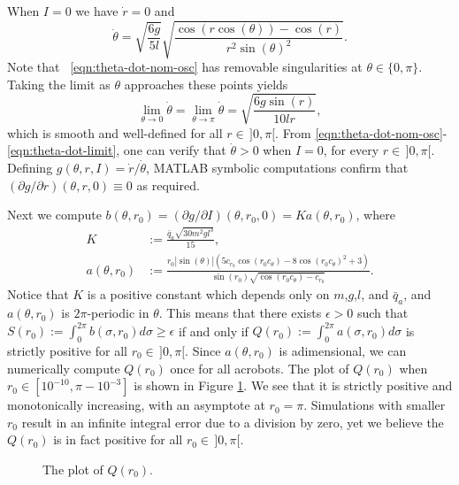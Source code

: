 \documentclass[journal,twoside,web]{ieeecolor}
\begin{document}
{When \(I = 0\) we have \(\dot{r} = 0\) and
\begin{equation} \label{eqn:theta-dot-nom-osc}
    \dot{\theta} = \sqrt{\frac{6g}{5l}} 
        \sqrt{\frac{\cos(r\cos(\theta)) - \cos(r)}
            {r^2 \sin(\theta)^2}}
    .
\end{equation}
Note that ~\eqref{eqn:theta-dot-nom-osc} has removable singularities at
\(\theta \in \{0,\pi\}\).
Taking the limit as \(\theta\) approaches these points yields
\begin{equation}\label{eqn:theta-dot-limit}
    \lim\limits_{\theta \to 0}\dot{\theta} 
    = \lim\limits_{\theta \to \pi} \dot{\theta}
    = \sqrt{\frac{6g \sin(r)}{10lr}}
    , 
\end{equation}
which is smooth and well-defined for all
\(r \in \, ]0,\pi[\).
From \eqref{eqn:theta-dot-nom-osc}-\eqref{eqn:theta-dot-limit},
one can verify that \(\dot{\theta} > 0\) when \(I = 0\), for every 
\(r \in \, ]0,\pi[\).
Defining \(g(\theta,r,I) = \dot{r}/\dot{\theta}\), MATLAB symbolic computations
confirm that \((\partial g/\partial r)(\theta,r,0) \equiv 0\) as required.

Next we compute
\(b(\theta,r_0) = (\partial g/\partial I)(\theta, r_0, 0) = K a(\theta,r_0)\),
where
\begin{align*}
    K &:= \frac{\bar{q}_a \sqrt{30m^2g l^3}}{15}
    , \\
    a(\theta,r_0) &:= \frac{
        r_0 |\sin(\theta)| \left(
        5 c_{r_0} \cos(r_0 c_\theta) - 8 \cos(r_0c_\theta)^2 + 3
    \right)
    }{
    \sin(r_0)\sqrt{\cos(r_0c_\theta) - c_{r_0}}
    }
    .
\end{align*}
Notice that \(K\) is a positive constant which depends only on
\(m\),\(g\),\(l\), and \(\bar{q}_a\), and \(a(\theta,r_0)\) is \(2\pi\)-periodic
in \(\theta\).
This means that there exists \(\epsilon > 0\) such that 
\(S(r_0) := \int_0^{2\pi} b(\sigma,r_0)d\sigma \geq \epsilon\)
if and only if \(Q(r_0) := \int_0^{2\pi} a(\sigma,r_0) d\sigma\) is strictly
positive for all \(r_0 \in \, ]0,\pi[\).
Since \(a(\theta,r_0)\) is adimensional, we can numerically compute \(Q(r_0)\)
once for all acrobots.
The plot of \(Q(r_0)\) when \(r_0 \in [10^{-10}, \pi - 10^{-3}]\) is shown in
Figure \ref{fig:acrobot-Q}.
We see that it is strictly positive and monotonically increasing, with an
asymptote at \(r_0 = \pi\).
Simulations with smaller \(r_0\) result in an infinite integral error due to a
division by zero, yet we believe the \(Q(r_0)\) is in fact positive for all 
\(r_0 \in \, ]0,\pi[\).
\begin{figure}
    \centering
    \caption{The plot of \(Q(r_0)\).}
    \label{fig:acrobot-Q}
\end{figure}

}
\end{document}

